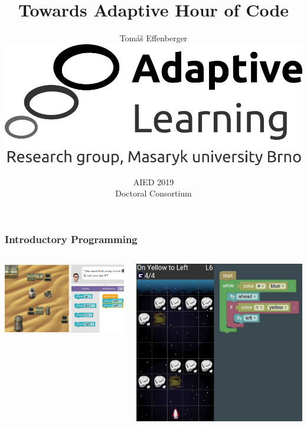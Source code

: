 \documentclass[bigger]{beamer}
\title{Towards Adaptive Hour of Code}
\author{Tom\'a\v{s} Effenberger\\[4mm]
\includegraphics[width=.3\linewidth]{figures/al-logo}\\[6mm]
}
\date{AIED 2019\\Doctoral Consortium}
\newcommand{\mute}[1]{
  {\color{gray}{#1}}
}
\begin{document}
\frame{\titlepage}

\begin{frame}
  \frametitle{Introductory Programming}


    \begin{columns}
      \begin{center}
        \includegraphics[width=\linewidth]{figures/hour-of-code-sw}
        \mute{https://hourofcode.com}
      \end{center}

      \begin{center}
        \includegraphics[width=\linewidth]{figures/robomission-on-yellow-to-left}
        \mute{https://en.robomise.cz}
      \end{center}
    \end{columns}


\end{frame}
\end{document}
